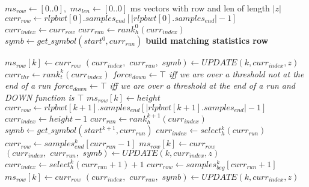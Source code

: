 \documentclass[a4paper,12pt, oneside]{book}
\begin{document}
\begin{algorithm}
  \scriptsize
  \begin{algorithmic}[1]
    \State $ms_{row}\gets [0..0],\,\,ms_{len}\gets [0..0]$
    \Comment ms vectors with row and len of length $|z|$
    \State $curr_{row}\gets
    rlpbwt[0].samples_{end}[|rlpbwt[0].samples_{end}|-1]$
    \State $curr_{index}\gets curr_{row}$
    \State $curr_{run}\gets rank_h^0(curr_{index})$
    \State $symb\gets get\_symbol(start^0, curr_{run})$
    \Comment \textbf{build matching statistics row}
    \For {\textit{every} $k\in[0, |z|)$}

    \State $ms_{row}[k]\gets curr_{row}$
     \State $(curr_{index},\,\,curr_{run},\,\,symb)\gets UPDATE(k, curr_{index},
    z)$ 
    \EndIf
    \Else
    \State $curr_{thr}\gets rank_t^k(curr_{index})$
    \State $force_{down} \gets \top$\textit{ iff we are over a threshold not at
    the end of a run}
     \State $force_{down} \gets \top$\textit{ iff we are over a threshold at
    the end of a run and DOWN function is $\top$}
    \State $ms_{row}[k]\gets height$
    \State $curr_{row}\gets
    rlpbwt[k+1].samples_{end}[|rlpbwt[k+1].samples_{end}|-1]$
    \State $curr_{index}\gets height-1$
    \State $curr_{run}\gets rank_h^{k+1}(curr_{index})$
    \State $symb\gets get\_symbol(start^{k+1}, curr_{run})$
    \EndIf
    \State $curr_{index}\gets select_h^{k}(curr_{run})$
    \State $curr_{row}\gets samples_{end}^k[curr_{run}-1]$
    \State $ms_{row}[k]\gets curr_{row}$
     \State $(curr_{index},\,\,curr_{run},\,\,symb)\gets UPDATE(k, curr_{index},
    z)$ 
    \EndIf
    \Else
    \State $curr_{index}\gets select_h^{k}(curr_{run}+1)+1$
    \State $curr_{row}\gets samples_{beg}^k[curr_{run}+1]$
    \State $ms_{row}[k]\gets curr_{row}$
     \State $(curr_{index},\,\,curr_{run},\,\,symb)\gets UPDATE(k, curr_{index},
    z)$ 
    \EndIf
    \EndIf
    

\end{algorithmic}
\end{algorithm}
\end{document}
